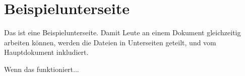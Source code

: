 \section{Beispielunterseite}
Das ist eine Beispielunterseite. Damit Leute an einem Dokument gleichzeitig arbeiten können, werden die Dateien in Unterseiten geteilt, und vom Hauptdokument inkludiert.

Wenn das funktioniert...


